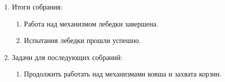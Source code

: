 \begin{enumerate}
\begin{enumerate}
    \end{enumerate}
    
	\item Итоги собрания: \newline
	\begin{enumerate}
	  \item	Работа над механизмом лебедки завершена.\newline
	  
	  \item	Испытания лебедки прошли успешно.\newline
	  
    \end{enumerate}
    
	\item Задачи для последующих собраний:\newline
	\begin{enumerate}
	  \item	Продолжить работать над механизмами ковша и захвата корзин.\newline
	  
    \end{enumerate}     
\end{enumerate}

\fillpage


